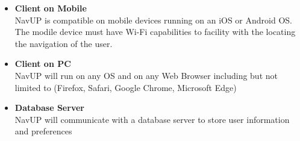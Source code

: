 \begin{itemize}
\item \textbf{Client on Mobile}\\
NavUP is compatible on mobile devices running on an iOS or Android OS. The modile device must have Wi-Fi capabilities to facility with the locating the navigation of the user.
\item \textbf{Client on PC}\\
NavUP will run on any OS and on any Web Browser including but not limited to (Firefox, Safari, Google Chrome, Microsoft Edge)
\item \textbf{Database Server}\\
NavUP will communicate with a database server to store user information and preferences

\end{itemize}
